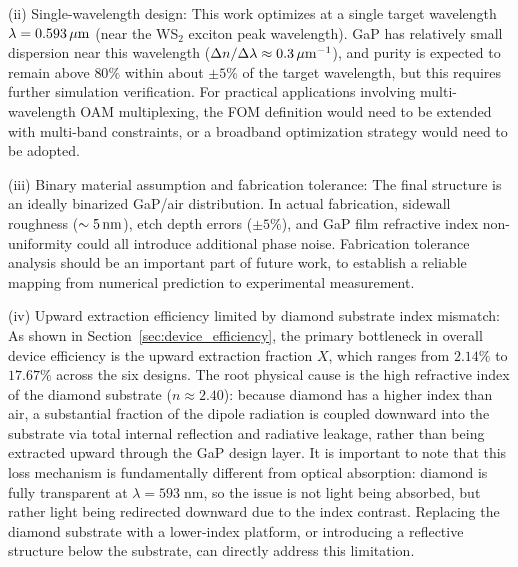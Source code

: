 (ii) Single-wavelength design: This work optimizes at a single target wavelength $\lambda = 0.593\,\mu{\rm m}$ (near the WS$_2$ exciton peak wavelength). GaP has relatively small dispersion near this wavelength ($\Delta n/\Delta\lambda \approx 0.3\,\mu{\rm m}^{-1}$), and purity is expected to remain above $80\%$ within about $\pm 5\%$ of the target wavelength, but this requires further simulation verification. For practical applications involving multi-wavelength OAM multiplexing, the FOM definition would need to be extended with multi-band constraints, or a broadband optimization strategy would need to be adopted.

(iii) Binary material assumption and fabrication tolerance: The final structure is an ideally binarized GaP/air distribution. In actual fabrication, sidewall roughness ($\sim 5\,{\rm nm}$), etch depth errors ($\pm 5\%$), and GaP film refractive index non-uniformity could all introduce additional phase noise. Fabrication tolerance analysis should be an important part of future work, to establish a reliable mapping from numerical prediction to experimental measurement.

(iv) Upward extraction efficiency limited by diamond substrate index mismatch: As shown in Section~\ref{sec:device_efficiency}, the primary bottleneck in overall device efficiency is the upward extraction fraction $X$, which ranges from $2.14\%$ to $17.67\%$ across the six designs. The root physical cause is the high refractive index of the diamond substrate ($n \approx 2.40$): because diamond has a higher index than air, a substantial fraction of the dipole radiation is coupled downward into the substrate via total internal reflection and radiative leakage, rather than being extracted upward through the GaP design layer. It is important to note that this loss mechanism is fundamentally different from optical absorption: diamond is fully transparent at $\lambda = 593\;$nm, so the issue is not light being absorbed, but rather light being redirected downward due to the index contrast. Replacing the diamond substrate with a lower-index platform, or introducing a reflective structure below the substrate, can directly address this limitation.